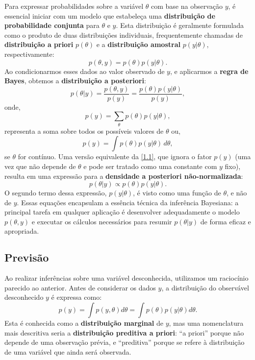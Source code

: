 Para expressar probabilidades sobre a variável $ \theta $ com base na observação $ y $, é essencial iniciar com um modelo que estabeleça uma \textbf{distribuição de probabilidade conjunta} para $ \theta $ e $ y $. Esta distribuição é geralmente formulada como o produto de duas distribuições individuais, frequentemente chamadas de \textbf{distribuição a priori} $ p(\theta) $ e a \textbf{distribuição amostral} $ p(y|\theta) $, respectivamente:
\begin{equation*}
p(\theta, y) = p(\theta)p(y|\theta).
\end{equation*}
Ao condicionarmos esses dados ao valor observado de $ y $, e aplicarmos a \textbf{regra de Bayes}, obtemos a \textbf{distribuição a posteriori}:
\begin{equation}\label{1.1}
p(\theta|y) = \frac{p(\theta, y)}{p(y)} = \frac{p(\theta)p(y|\theta)}{p(y)},
\end{equation}
onde,
\begin{equation*}
p(y) = \sum_\theta p(\theta)p(y|\theta),
\end{equation*}
representa a soma sobre todos os possíveis valores de $ \theta $ ou,
\begin{equation*}
p(y) = \int p(\theta)p(y|\theta)\,d\theta,
\end{equation*}
se $ \theta $ for contínuo. Uma versão equivalente da \autoref{1.1}, que ignora o fator $ p(y) $ (uma vez que não depende de $ \theta $ e pode ser tratado como uma constante com $ y $ fixo), resulta em uma expressão para a \textbf{densidade a posteriori não-normalizada}:
\begin{equation}\label{1.2}
p(\theta|y) \propto p(\theta)p(y|\theta).
\end{equation}
O segundo termo dessa expressão, $ p(y|\theta) $, é visto como uma função de $ \theta $, e não de $ y $. Essas equações encapsulam a essência técnica da inferência Bayesiana: a principal tarefa em qualquer aplicação é desenvolver adequadamente o modelo $ p(\theta, y) $ e executar os cálculos necessários para resumir $ p(\theta|y) $ de forma eficaz e apropriada.

\subsection{Previsão}

Ao realizar inferências sobre uma variável desconhecida, utilizamos um raciocínio parecido ao anterior. Antes de considerar os dados $ y $, a distribuição do observável desconhecido $ y $ é expressa como:
\begin{equation}
p(y) = \int p(y, \theta)d\theta = \int p(\theta)p(y|\theta)d\theta.
\end{equation}
Esta é conhecida como a \textbf{distribuição marginal} de $ y $, mas uma nomenclatura mais descritiva seria a \textbf{distribuição preditiva a priori}: ``a priori'' porque não depende de uma observação prévia, e ``preditiva'' porque se refere à distribuição de uma variável que ainda será observada.

